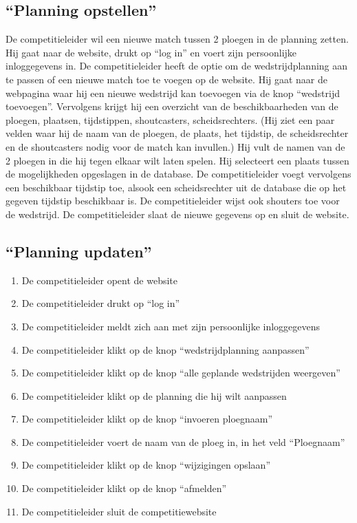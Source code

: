 \documentclass[12pt,a4paper]{article}
\begin{document}
			\subsection{``Planning opstellen''}
			De competitieleider wil een nieuwe match tussen 2 ploegen in de planning zetten. Hij gaat naar de website, drukt op “log in” en voert zijn persoonlijke inloggegevens in. De competitieleider heeft de optie om de wedstrijdplanning aan te passen of een nieuwe match toe te voegen op de website. Hij gaat naar de webpagina waar hij een nieuwe wedstrijd kan toevoegen via de knop “wedstrijd toevoegen”. Vervolgens krijgt hij een overzicht van de beschikbaarheden van de ploegen, plaatsen, tijdstippen, shoutcasters, scheidsrechters. (Hij ziet een paar velden waar hij de naam van de ploegen, de plaats, het tijdstip, de scheidsrechter en de shoutcasters nodig voor de match kan invullen.) Hij vult de namen van de 2 ploegen in die hij tegen elkaar wilt laten spelen. Hij selecteert een plaats tussen de mogelijkheden opgeslagen in de database. De competitieleider voegt vervolgens een beschikbaar tijdstip toe, alsook een scheidsrechter uit de database die op het gegeven tijdstip beschikbaar is. De competitieleider wijst ook shouters toe voor de wedstrijd. De competitieleider slaat de nieuwe gegevens op en sluit de website.
			\newpage
			\subsection{``Planning updaten''}
			\begin{enumerate}
				\item De competitieleider opent de website
				\item De competitieleider drukt op ``log in''
				\item De competitieleider meldt zich aan met zijn persoonlijke inloggegevens
				\item De competitieleider klikt op de knop ``wedstrijdplanning aanpassen''
				\item De competitieleider klikt op de knop ``alle geplande wedstrijden weergeven''
				\item De competitieleider klikt op de planning die hij wilt aanpassen
				\item De competitieleider klikt op de knop ``invoeren ploegnaam''
				\item De competitieleider voert de naam van de ploeg in, in het veld ``Ploegnaam''
				\item De competitieleider klikt op de knop ``wijzigingen opslaan''
				\item De competitieleider klikt op de knop ``afmelden''
				\item De competitieleider sluit de competitiewebsite
			\end{enumerate}
\end{document}
